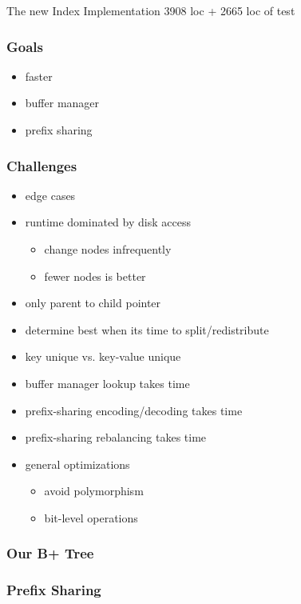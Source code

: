\documentclass{beamer}
\begin{document}
  \begin{section}{The new Index Implementation}
    3908 loc + 2665 loc of test
    \begin{frame}
      \frametitle{Goals}
        \begin{itemize}
          \item faster
          \item buffer manager
          \item prefix sharing
        \end{itemize}
    \end{frame}
    \begin{frame}
      \frametitle{Challenges}
        \begin{itemize}
          \item edge cases
          \item runtime dominated by disk access
          \begin{itemize}
            \item change nodes infrequently
            \item fewer nodes is better
          \end{itemize}
          \item only parent to child pointer
          \item determine best when its time to split/redistribute
          \item key unique vs. key-value unique
          \item buffer manager lookup takes time 
          \item prefix-sharing encoding/decoding takes time
          \item prefix-sharing rebalancing takes time
          \item general optimizations
            \begin{itemize}
              \item avoid polymorphism
              \item bit-level operations
            \end{itemize}
        \end{itemize}
    \end{frame}
    \begin{frame}
      \frametitle{Our B+ Tree}
    \end{frame}
    \begin{frame}
      \frametitle{Prefix Sharing}
    \end{frame}
  \end{section}
\end{document}

